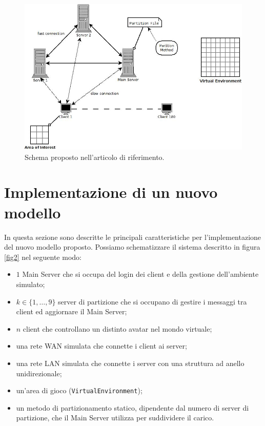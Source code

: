 \documentclass[a4paper, 11pt, oneside]{book}
\theoremstyle{definition}
\theoremstyle{remark}
\begin{document}
\begin{figure}
\label{fig1}
\begin{center}
\includegraphics[scale=0.50]{schema.jpeg}
\end{center}
\caption{Schema proposto nell'articolo di riferimento.}
\end{figure}


\section{Implementazione di un nuovo modello}

In questa sezione sono descritte le principali caratteristiche per 
l'implementazione del nuovo modello proposto. Possiamo schematizzare il
sistema descritto in figura \ref{fig2} nel seguente modo:
\begin{itemize}
\item
$1$ Main Server che si occupa del login dei client e della gestione
dell'ambiente simulato;
\item
$k \in \{1, \ldots, 9\}$ server di partizione che si occupano di gestire i
messaggi tra client ed aggiornare il Main Server;
\item
$n$ client che controllano un distinto avatar nel mondo virtuale;
\item
una rete WAN simulata che connette i client ai server;
\item
una rete LAN simulata che connette i server con una struttura ad anello 
unidirezionale;
\item
un'area di gioco (\texttt{VirtualEnvironment});
\item
un metodo di partizionamento statico, dipendente dal numero di server di
partizione, che il Main Server utilizza per suddividere il carico.
\end{itemize}
\end{document}

